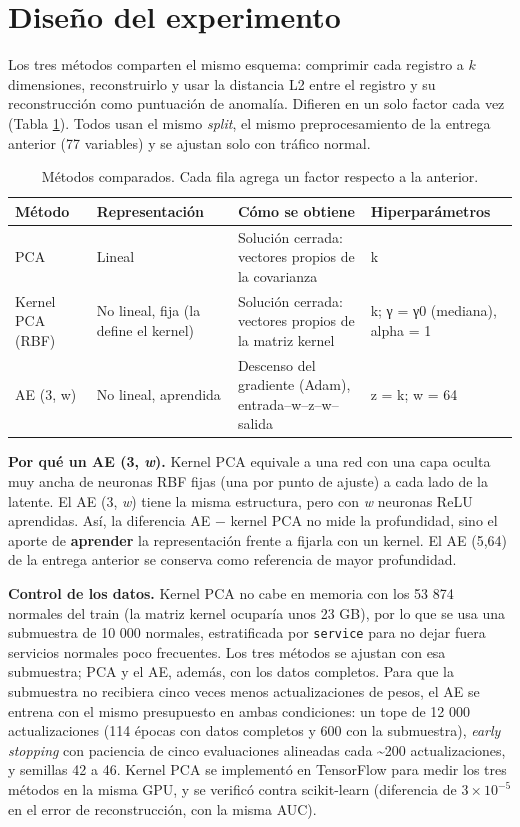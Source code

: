 \documentclass[
  11pt,
]{article}
\begin{document}
\hypertarget{sec:diseno}{%
\section{Diseño del experimento}\label{sec:diseno}}

Los tres métodos comparten el mismo esquema: comprimir cada registro a \(k\) dimensiones, reconstruirlo
y usar la distancia L2 entre el registro y su reconstrucción como puntuación de anomalía. Difieren en un
solo factor cada vez (Tabla \ref{tab:metodos}). Todos usan el mismo \emph{split}, el mismo preprocesamiento
de la entrega anterior (77 variables) y se ajustan solo con tráfico normal.

\begin{table}[!h]
\centering
\caption{\label{tab:metodos}Métodos comparados. Cada fila agrega un factor respecto a la anterior.}
\centering
\fontsize{8}{10}\selectfont
\begin{tabular}[t]{>{\raggedright\arraybackslash}p{2.2cm}>{\raggedright\arraybackslash}p{3.6cm}>{\raggedright\arraybackslash}p{5.4cm}>{\raggedright\arraybackslash}p{3.2cm}}
\toprule
Método & Representación & Cómo se obtiene & Hiperparámetros\\
\midrule
PCA & Lineal & Solución cerrada: vectores propios de la covarianza & k\\
Kernel PCA (RBF) & No lineal, fija (la define el kernel) & Solución cerrada: vectores propios de la matriz kernel & k; γ = γ0 (mediana), alpha = 1\\
AE (3, w) & No lineal, aprendida & Descenso del gradiente (Adam), entrada–w–z–w–salida & z = k; w = 64\\
\bottomrule
\end{tabular}
\end{table}

\textbf{Por qué un AE (3, \emph{w}).} Kernel PCA equivale a una red con una capa oculta muy ancha de neuronas RBF
fijas (una por punto de ajuste) a cada lado de la latente. El AE (3, \emph{w}) tiene la misma estructura, pero
con \emph{w} neuronas ReLU aprendidas. Así, la diferencia AE − kernel PCA no mide la profundidad, sino el
aporte de \textbf{aprender} la representación frente a fijarla con un kernel. El AE (5,64) de la entrega
anterior se conserva como referencia de mayor profundidad.

\textbf{Control de los datos.} Kernel PCA no cabe en memoria con los 53 874 normales del train (la matriz
kernel ocuparía unos 23 GB), por lo que se usa una submuestra de 10 000 normales, estratificada por
\texttt{service} para no dejar fuera servicios normales poco frecuentes. Los tres métodos se ajustan con esa
submuestra; PCA y el AE, además, con los datos completos. Para que la submuestra no recibiera cinco veces
menos actualizaciones de pesos, el AE se entrena con el mismo presupuesto en ambas condiciones: un tope
de 12 000 actualizaciones (114 épocas con datos completos y 600 con la submuestra), \emph{early stopping}
con paciencia de cinco evaluaciones alineadas cada \textasciitilde200 actualizaciones, y semillas 42 a 46. Kernel PCA
se implementó en TensorFlow para medir los tres métodos en la misma GPU, y se verificó contra
scikit-learn (diferencia de \(3 \times 10^{-5}\) en el error de reconstrucción, con la misma AUC).
\end{document}
